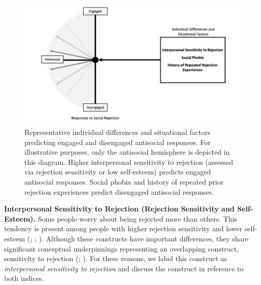 \documentclass[
]{udthesis}
\begin{document}
\begin{figure}
\includegraphics[width=1\linewidth]{images/bidr-antisocial} \caption{Representative individual differences and situational factors predicting engaged and disengaged antisocial responses. For illustrative purposes, only the antisocial hemisphere is depicted in this diagram. Higher interpersonal sensitivity to rejection (assessed via rejection sensitivity or low self-esteem) predicts engaged antisocial responses. Social phobia and history of repeated prior rejection experiences predict disengaged antisocial responses.}\label{fig:bidr-antisocial}
\end{figure}

\textbf{Interpersonal Sensitivity to Rejection (Rejection Sensitivity and
Self-Esteem).} Some people worry about being rejected more than others.
This tendency is present among people with higher rejection sensitivity
and lower self-esteem (; ; ). Although these constructs
have important differences, they share significant conceptual
underpinnings representing an overlapping construct, sensitivity to
rejection (; ). For these reasons, we label this
construct as \emph{interpersonal sensitivity to rejection} and discuss the
construct in reference to both indices.
\end{document}
